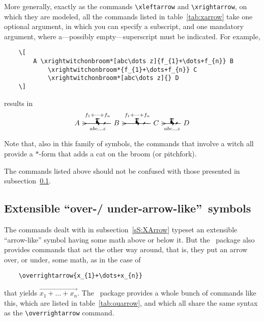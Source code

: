 \documentclass[a4paper]{article}
\newcommand*{\halloweenmath}{\packlass{halloweenmath}}
\newcommand*{\amsmath}      {\packlass{amsmath}}
\begin{document}
More generally, exactly as the commands \verb|\xleftarrow| and
\verb|\xrightarrow|, on which they are modeled, all the commands listed in
table~\ref{tab:xarrow} take one optional argument, in which you can specify a
subscript, and one mandatory argument, where a---possibly empty---superscript
must be indicated.  For example,
\begin{verbatim}
	\[
	    A \xrightwitchonbroom*[abc\dots z]{f_{1}+\dots+f_{n}} B
	        \xrightwitchonbroom*{f_{1}+\dots+f_{n}} C
	        \xrightwitchonbroom*[abc\dots z]{} D
	\]  
\end{verbatim}
results in
\[
	A \xrightwitchonbroom*[abc\dots z]{f_{1}+\dots+f_{n}} B
		\xrightwitchonbroom*{f_{1}+\dots+f_{n}} C
		\xrightwitchonbroom*[abc\dots z]{} D
\]

Note that, also in this family of symbols, the commands that involve a witch all
provide a \mbox{$*$-form} that adds a cat on the broom (or pitchfork).

The commands listed above should not be confused with those presented in
subsection~\ref{sS:OUArrow}.



\subsection{Extensible \textquotedblleft over-\protect\slash
	under-arrow-like\textquotedblright\ symbols}
\label{sS:OUArrow}

The commands dealt with in subsection~\ref{sS:XArrow} typeset an extensible
``arrow-like'' symbol having some math above or below it.  But the \amsmath\
package also provides commands that act the other way around, that is, they put
an arrow over, or under, some math, as in the case of
\begin{verbatim}
	\overrightarrow{x_{1}+\dots+x_{n}}
\end{verbatim}
that yields \( \overrightarrow{x_{1}+\dots+x_{n}} \).  The \halloweenmath\ 
package provides a whole bunch of commands like this, which are listed in 
table~\ref{tab:ouarrow}, and which all share the same syntax as the 
\verb|\overrightarrow| command.
\end{document}
